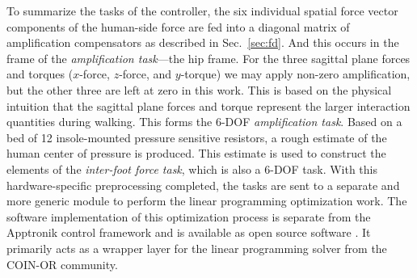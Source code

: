 \documentclass[utf8]{frontiersSCNS}
\renewcommand*{\cite}[1]{\citep{#1}}
\begin{document}
To summarize the tasks of the controller, the six individual spatial force vector components of the human-side force are fed into a diagonal matrix of amplification compensators as described in Sec.~\ref{sec:fd}. And this occurs in the frame of the \emph{amplification task}---the hip frame. For the three sagittal plane forces and torques ($x$-force, $z$-force, and $y$-torque) we may apply non-zero amplification, but the other three are left at zero in this work. This is based on the physical intuition that the sagittal plane forces and torque represent the larger interaction quantities during walking. This forms the 6-DOF \emph{amplification task}.
Based on a bed of 12 insole-mounted pressure sensitive resistors, a rough estimate of the human center of pressure is produced. This estimate is used to construct the elements of the \emph{inter-foot force task}, which is also a 6-DOF task.
With this hardware-specific preprocessing completed, the tasks are sent to a separate and more generic module to perform the linear programming optimization work. The software implementation of this optimization process is separate from the Apptronik control framework and is available as open source software \cite{Thomas2019LPExo}. It primarily acts as a wrapper layer for the linear programming solver from the COIN-OR \cite{LougeeHeimer2003IBM} community.
\end{document}
